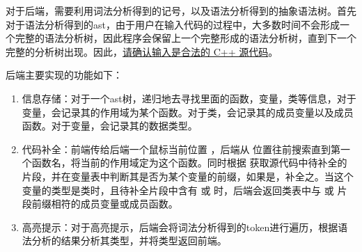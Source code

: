 对于后端，需要利用词法分析得到的记号，以及语法分析得到的抽象语法树。首先对于语法分析得到的ast，由于用户在输入代码的过程中，大多数时间不会形成一个完整的语法分析树，因此程序会保留上一个完整形成的语法分析树，直到下一个完整的分析树出现。因此，\underline{请确认输入是合法的 C++ 源代码}。

后端主要实现的功能如下：
\begin{enumerate}
    \item 信息存储：对于一个ast树，递归地去寻找里面的函数，变量，类等信息，对于变量，会记录其的作用域为某个函数。对于类，会记录其的成员变量以及成员函数。对于变量，会记录其的数据类型。
    \item 代码补全：前端传给后端一个鼠标当前位置  ，后端从  位置往前搜索直到第一个函数名，将当前的作用域定为这个函数。同时根据  获取源代码中待补全的片段，并在变量表中判断其是否为某个变量的前缀，如果是，补全之。当这个变量的类型是类时，且待补全片段中含有  或 \code{->} 时，后端会返回类表中与  或 \code{->} 片段前缀相符的成员变量或成员函数。
    \item 高亮提示：对于高亮提示，后端会将词法分析得到的token进行遍历，根据语法分析的结果分析其类型，并将类型返回前端。
\end{enumerate}


